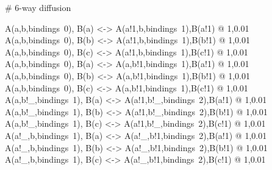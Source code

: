 \begin{kappasource}

# 6-way diffusion


A(a,b,bindings~0), B(a) <-> A(a!1,b,bindings~1),B(a!1) @ 1,0.01
A(a,b,bindings~0), B(b) <-> A(a!1,b,bindings~1),B(b!1) @ 1,0.01
A(a,b,bindings~0), B(c) <-> A(a!1,b,bindings~1),B(c!1) @ 1,0.01
A(a,b,bindings~0), B(a) <-> A(a,b!1,bindings~1),B(a!1) @ 1,0.01
A(a,b,bindings~0), B(b) <-> A(a,b!1,bindings~1),B(b!1) @ 1,0.01
A(a,b,bindings~0), B(c) <-> A(a,b!1,bindings~1),B(c!1) @ 1,0.01
A(a,b!_,bindings~1), B(a) <-> A(a!1,b!_,bindings~2),B(a!1) @ 1,0.01
A(a,b!_,bindings~1), B(b) <-> A(a!1,b!_,bindings~2),B(b!1) @ 1,0.01
A(a,b!_,bindings~1), B(c) <-> A(a!1,b!_,bindings~2),B(c!1) @ 1,0.01
A(a!_,b,bindings~1), B(a) <-> A(a!_,b!1,bindings~2),B(a!1) @ 1,0.01
A(a!_,b,bindings~1), B(b) <-> A(a!_,b!1,bindings~2),B(b!1) @ 1,0.01
A(a!_,b,bindings~1), B(c) <-> A(a!_,b!1,bindings~2),B(c!1) @ 1,0.01


\end{kappasource}

